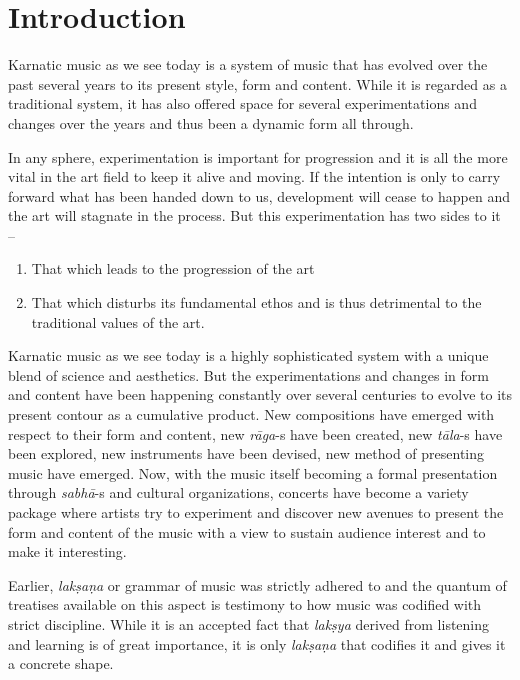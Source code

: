 \section*{Introduction}

Karnatic music as we see today is a system of music that has evolved over the past several years to its present style, form and content. While it is regarded as a traditional system, it has also offered space for several experimentations and changes over the years and thus been a dynamic form all through.

In any sphere, experimentation is important for progression and it is all the more vital in the art field to keep it alive and moving. If the intention is only to carry forward what has been handed down to us, development will cease to happen and the art will stagnate in the process. But this experimentation has two sides to it –

\vspace{-.3cm}

\begin{enumerate}
\itemsep=0pt
\item That which leads to the progression of the art

 \item That which disturbs its fundamental ethos and is thus detrimental to the traditional values of the art.

\end{enumerate}

\vspace{-.3cm}

Karnatic music as we see today is a highly sophisticated system with a unique blend of science and aesthetics. But the experimentations and changes in form and content have been happening constantly over several centuries to evolve to its present contour as a cumulative product. New compositions have emerged with respect to their form and content, new \textit{rāga}-s have been created, new \textit{tāla}-s have been explored, new instruments have been devised, new method of presenting music have emerged. Now, with the music itself becoming a formal presentation through \textit{sabhā}-s and cultural organizations, concerts have become a variety package where artists try to experiment and discover new avenues to present the form and content of the music with a view to sustain audience interest and to make it interesting.

Earlier, \textit{lakṣaṇa} or grammar of music was strictly adhered to and the quantum of treatises available on this aspect is testimony to how music was codified with strict discipline. While it is an accepted fact that \textit{lakṣya} derived from listening and learning is of great importance, it is only \textit{lakṣaṇa} that codifies it and gives it a concrete shape.

